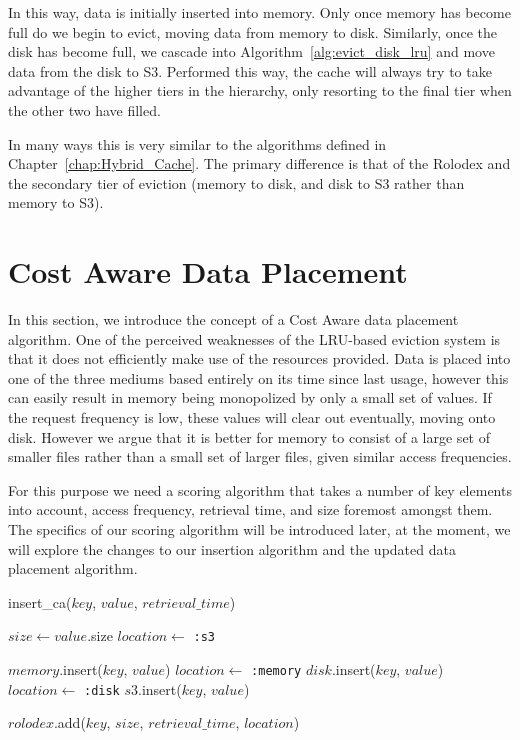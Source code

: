 In this way, data is initially inserted into memory. Only once memory has
become full do we begin to evict, moving data from memory to disk. Similarly,
once the disk has become full, we cascade into
Algorithm~\ref{alg:evict_disk_lru} and move data from the disk to S3. Performed
this way, the cache will always try to take advantage of the higher tiers in the
hierarchy, only resorting to the final tier when the other two have filled.

In many ways this is very similar to the algorithms defined in
Chapter~\ref{chap:Hybrid_Cache}. The primary difference is that of the Rolodex
and the secondary tier of eviction (memory to disk, and disk to S3 rather than
memory to S3).

\section{Cost Aware Data Placement} %
\label{sec:cost-aware}
In this section, we introduce the concept of a Cost Aware data placement
algorithm. One of the perceived weaknesses of the LRU-based eviction system is
that it does not efficiently make use of the resources provided. Data is placed
into one of the three mediums based entirely on its time since last usage,
however this can easily result in memory being monopolized by only a small set
of values. If the request frequency is low, these values will clear out
eventually, moving onto disk. However we argue that it is better for memory to
consist of a large set of smaller files rather than a small set of larger
files, given similar access frequencies.

For this purpose we need a scoring algorithm that takes a number of key
elements into account, access frequency, retrieval time, and size foremost
amongst them. The specifics of our scoring algorithm will be introduced later,
at the moment, we will explore the changes to our insertion algorithm and the
updated data placement algorithm.

\begin{algorithm}[htp]
\small
\caption{\label{alg:insert_ca}insert\_ca($key$, $value$, $retrieval\_time$)}
\begin{algorithmic}[1]
\STATE $size \leftarrow value$.size
\STATE $location \leftarrow$ {\tt :s3}

  \STATE $memory$.insert($key$, $value$)
	\STATE $location \leftarrow$ {\tt :memory}
	\STATE $disk$.insert($key$, $value$)
	\STATE $location \leftarrow$ {\tt :disk}
\ELSE
	\STATE $s3$.insert($key$, $value$)
\ENDIF

\STATE $rolodex$.add($key$, $size$, $retrieval\_time$, $location$)
\end{algorithmic}
\end{algorithm}

